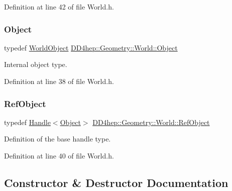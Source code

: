 Definition at line 42 of file World.\+h.

\hypertarget{class_d_d4hep_1_1_geometry_1_1_world_ade4542483ec578548cb266880f67e329}{}\label{class_d_d4hep_1_1_geometry_1_1_world_ade4542483ec578548cb266880f67e329} 
\subsubsection{\texorpdfstring{Object}{Object}}
{\footnotesize\ttfamily typedef \hyperlink{class_d_d4hep_1_1_geometry_1_1_world_object}{World\+Object} \hyperlink{class_d_d4hep_1_1_geometry_1_1_world_ade4542483ec578548cb266880f67e329}{D\+D4hep\+::\+Geometry\+::\+World\+::\+Object}}



Internal object type. 



Definition at line 38 of file World.\+h.

\hypertarget{class_d_d4hep_1_1_geometry_1_1_world_a796916c7109e45753547adc18d85aa7f}{}\label{class_d_d4hep_1_1_geometry_1_1_world_a796916c7109e45753547adc18d85aa7f} 
\subsubsection{\texorpdfstring{Ref\+Object}{RefObject}}
{\footnotesize\ttfamily typedef \hyperlink{class_d_d4hep_1_1_handle}{Handle}$<$\hyperlink{class_d_d4hep_1_1_geometry_1_1_world_ade4542483ec578548cb266880f67e329}{Object}$>$ \hyperlink{class_d_d4hep_1_1_geometry_1_1_world_a796916c7109e45753547adc18d85aa7f}{D\+D4hep\+::\+Geometry\+::\+World\+::\+Ref\+Object}}



Definition of the base handle type. 



Definition at line 40 of file World.\+h.



\subsection{Constructor \& Destructor Documentation}
\hypertarget{class_d_d4hep_1_1_geometry_1_1_world_a0de7a5ff6ecdfc4ac5fc3b05585eef32}{}\label{class_d_d4hep_1_1_geometry_1_1_world_a0de7a5ff6ecdfc4ac5fc3b05585eef32} 
